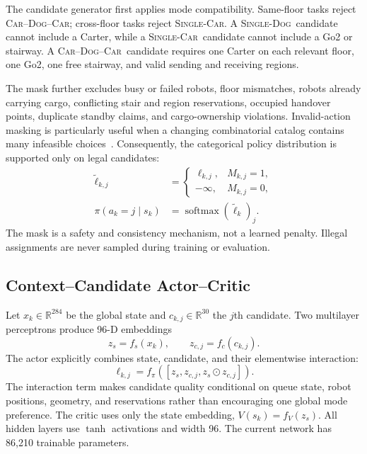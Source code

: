 \documentclass[journal]{IEEEtran}
\DeclareRobustCommand{\modecar}{\mbox{\textsc{Single-Car}}\xspace}
\DeclareRobustCommand{\modedog}{\mbox{\textsc{Single-Dog}}\xspace}
\DeclareRobustCommand{\modechain}{\mbox{\textsc{Car--Dog--Car}}\xspace}
\begin{document}
The candidate generator first applies mode compatibility. Same-floor tasks reject \modechain; cross-floor tasks reject \modecar. A \modedog{}~candidate cannot include a Carter, while a \modecar{}~candidate cannot include a Go2 or stairway. A \modechain{}~candidate requires one Carter on each relevant floor, one Go2, one free stairway, and valid sending and receiving regions.

The mask further excludes busy or failed robots, floor mismatches, robots already carrying cargo, conflicting stair and region reservations, occupied handover points, duplicate standby claims, and cargo-ownership violations. Invalid-action masking is particularly useful when a changing combinatorial catalog contains many infeasible choices~\cite{huang2022masking}. Consequently, the categorical policy distribution is supported only on legal candidates:
\begin{align}
  \tilde{\ell}_{k,j}&=\begin{cases}
    \ell_{k,j}, & M_{k,j}=1,\\
    -\infty, & M_{k,j}=0,
  \end{cases} \label{eq:masked_logits}\\
  \pi(a_k=j\mid s_k)&=\operatorname{softmax}(\tilde{\ell}_k)_j.
  \label{eq:masked_policy}
\end{align}
The mask is a safety and consistency mechanism, not a learned penalty. Illegal assignments are never sampled during training or evaluation.

\subsection{Context--Candidate Actor--Critic}

Let $x_k\in\mathbb{R}^{284}$ be the global state and $c_{k,j}\in\mathbb{R}^{30}$ the $j$th candidate. Two multilayer perceptrons produce 96-D embeddings
\begin{equation}
 z_s=f_s(x_k),\qquad z_{c,j}=f_c(c_{k,j}).
\end{equation}
The actor explicitly combines state, candidate, and their elementwise interaction:
\begin{equation}
 \ell_{k,j}=f_\pi([z_s,z_{c,j},z_s\odot z_{c,j}]).
 \label{eq:actor}
\end{equation}
The interaction term makes candidate quality conditional on queue state, robot positions, geometry, and reservations rather than encouraging one global mode preference. The critic uses only the state embedding, $V(s_k)=f_V(z_s)$. All hidden layers use $\tanh$ activations and width 96. The current network has 86,210 trainable parameters.
\end{document}
